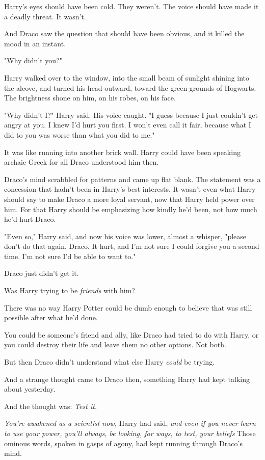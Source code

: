 Harry's eyes should have been cold. They weren't. The voice should have made it
a deadly threat. It wasn't.

And Draco saw the question that should have been obvious, and it killed the
mood in an instant.

"Why{\el} didn't you?"

Harry walked over to the window, into the small beam of sunlight shining into
the alcove, and turned his head outward, toward the green grounds of Hogwarts.
The brightness shone on him, on his robes, on his face.

"Why didn't I?" Harry said. His voice caught. "I guess because I just couldn't
get angry at you. I knew I'd hurt you first. I won't even call it fair, because
what I did to you was worse than what you did to me."

It was like running into another brick wall. Harry could have been speaking
archaic Greek for all Draco understood him then.

Draco's mind scrabbled for patterns and came up flat blank. The statement was a
concession that hadn't been in Harry's best interests. It wasn't even what
Harry should say to make Draco a more loyal servant, now that Harry held power
over him. For that Harry should be emphasizing how kindly he'd been, not how
much he'd hurt Draco.

"Even so," Harry said, and now his voice was lower, almost a whisper, "please
don't do that again, Draco. It hurt, and I'm not sure I could forgive you a
second time. I'm not sure I'd be able to want to."

Draco just didn't get it.

Was Harry trying to be \emph{friends} with him?

There was no way Harry Potter could be dumb enough to believe that was still
possible after what he'd done.

You could be someone's friend and ally, like Draco had tried to do with Harry,
or you could destroy their life and leave them no other options. Not both.

But then Draco didn't understand what else Harry \emph{could} be trying.

And a strange thought came to Draco then, something Harry had kept talking
about yesterday.

And the thought was: \emph{Test it.}

\emph{You're awakened as a scientist now,} Harry had said, \emph{and even if
you never learn to use your power, you'll always, be looking, for ways, to
test, your beliefs{\el}} Those ominous words, spoken in gasps of agony, had
kept running through Draco's mind.

